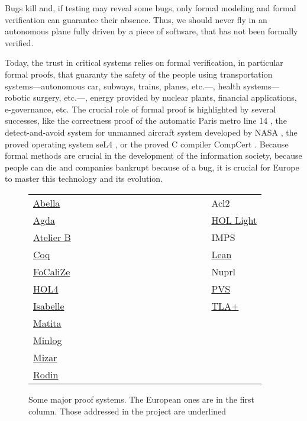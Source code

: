 Bugs kill and, if testing may reveal some bugs, only formal modeling
and formal verification can guarantee their absence.  Thus, we should
never fly in an autonomous plane fully driven by a piece of software,
that has not been formally verified.

Today, the trust in critical systems relies on formal verification, in
particular formal proofs, that guaranty the safety of the people using
transportation systems---autonomous car, subways, trains, planes,
etc.---, health systems---robotic surgery, etc.---, energy provided by
nuclear plants, financial applications, e-governance, etc. The crucial
role of formal proof is highlighted by several successes, like the
correctness proof of the automatic Paris metro line 14 \cite{metro14},
the detect-and-avoid system for unmanned aircraft system developed
by NASA \cite{Munoz16}, the proved operating system seL4 \cite{Klein09},
or the proved C compiler CompCert \cite{Leroy06}. Because formal methods are crucial in the
development of the information society, because people can die and
companies bankrupt because of a bug, it is crucial for Europe to
master this technology and its evolution.

\thispagestyle{empty}

\begin{figure}
\begin{tabular}{ll}
  {\sc \underline{Abella}}~~~~~~~~~~~~~~~~~~~~~~~~~~~~~~&{\sc Acl2}\\
{\sc \underline{Agda}} &  {\sc \underline{HOL Light}}\\
{\sc \underline{Atelier B}} &  {\sc IMPS}\\
{\sc \underline{Coq}}  &  {\sc \underline{Lean}}\\
{\sc \underline{FoCaliZe}}  &  {\sc Nuprl}\\
{\sc \underline{HOL4}}  &  {\sc \underline{PVS}}\\
{\sc \underline{Isabelle}}  &  {\sc \underline{TLA+}}\\
{\sc \underline{Matita}}\\
{\sc \underline{Minlog}}\\
{\sc \underline{Mizar}}\\
{\sc \underline{Rodin}}\\
\end{tabular}
\caption{Some major proof systems. The European ones are in the first column.
  Those addressed in the project are underlined\label{systems}}
\end{figure}

